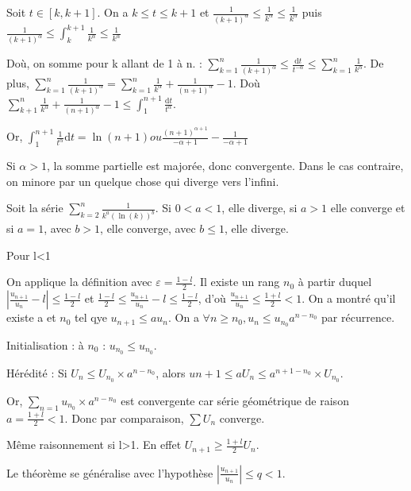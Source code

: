\documentclass[french]{yLectureNote}
\newcommand{\dd}[0]{\mathrm{d}}
\begin{document}
\begin{myproof}
Soit $t\in [k,k+1]$. On a $k\leq t\leq k+1$ et $\frac{1}{(k+1)^{\alpha}}\leq \frac{1}{k^{\alpha}}\leq \frac{1}{k^{\alpha}}$ puis $\frac{1}{(k+1)^{\alpha}}\leq \int^{k+1}_k \frac{1}{k^{\alpha}}\leq \frac{1}{k^{\alpha}}$

Doù, on somme pour k allant de 1 à n. : $\sum^n_{k=1}\frac{1}{(k+1)^{\alpha}} \leq \frac{\dd t}{t^{-\alpha}}\leq \sum^n_{k=1} \frac{1}{k^{\alpha}}$. De plus, $\sum^n_{k=1} \frac{1}{(k+1)^{\alpha}} = \sum^n_{k=1} \frac{1}{k^{\alpha}} + \frac{1}{(n+1)^{\alpha}} - 1$. Doù $\sum^n_{k+1} \frac{1}{k^{\alpha}} + \frac{1}{(n+1)^{\alpha}} - 1 \leq \int^{n+1}_1 \frac{\dd t}{t^{\alpha}}$.


Or, $\int^{n+1}_{1} \frac{1}{t^{\alpha}}\dd t = \ln(n+1) ou \frac{(n+1)^{\alpha+1}}{-\alpha+1} - \frac{1}{-\alpha +1}$

Si $\alpha >1$, la somme partielle est majorée, donc convergente. Dans le cas contraire, on minore par un quelque chose qui diverge vers l'infini.
\end{myproof}
\begin{proposition}
Soit la série \(\sum_{k=2}^n \frac{1}{k^a(\ln(k))^b}\). Si \(0<a<1\), elle diverge, si \(a>1\) elle converge et si \(a=1\), avec \(b>1\), elle converge, avec \(b\leq 1\), elle diverge.
\end{proposition}
\begin{myproof}
Pour l<1


On applique la définition avec $\varepsilon = \frac{1-l}{2}$. Il existe un rang $n_0$ à partir duquel $|\frac{u_{n+1}}{u_n}-l| \leq \frac{1-l}{2}$ et $\frac{1-l}{2} \leq  \frac{u_{n+1}}{u_n}-l \leq \frac{1-l}{2}$, d'où $\frac{u_{n+1}}{u_n} \leq \frac{1+l}{2} < 1$. On a montré qu'il existe a et $n_0$ tel qye $u_{n+1}\leq a u_n$. On a $\forall n\geq n_0, u_n \leq u_{n_0} a^{n-n_0}$ par récurrence.

Initialisation : à $n_0$ : $u_{n_0} \leq u_{n_0}$.

Hérédité : Si $U_n \leq U_{n_0} \times a^{n-n_0}$, alors $u{n+1} \leq a U_n \leq a^{n+1-n_0} \times U_{n_0}$.

Or, $\sum_{n=1} u_{n_0}\times a^{n-n_0}$ est convergente car série géométrique de raison $a=\frac{1+l}{2}<1$. Donc par comparaison, $\sum U_n$ converge.

M\^eme raisonnement si l>1. En effet $U_{n+1} \geq \frac{1+l}{2} U_n$.
\end{myproof}
Le théorème se généralise avec l'hypothèse $|\frac{u_{n+1}}{u_n}| \leq q <1$.
\end{document}

